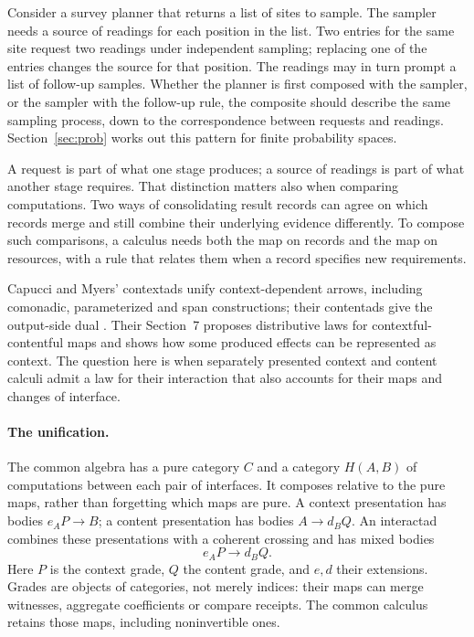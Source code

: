 \documentclass[11pt]{article}
\numberwithin{equation}{section}
\theoremstyle{definition}\newtheorem{definition}[theorem]{Definition}
\begin{document}
Consider a survey planner that returns a list of sites to sample. The
sampler needs a source of readings for each position in the list. Two
entries for the same site request two readings under independent
sampling; replacing one of the entries changes the source for that
position. The readings may in turn prompt a list of follow-up samples.
Whether the planner is first composed with the sampler, or the sampler
with the follow-up rule, the composite should describe the same sampling
process, down to the correspondence between requests and readings.
Section~\ref{sec:prob} works out this pattern for finite probability spaces.

A request is part of what one stage produces; a source of readings is
part of what another stage requires. That distinction matters also when
comparing computations. Two ways of consolidating result records can
agree on which records merge and still combine their underlying evidence
differently. To compose such comparisons, a calculus needs both the map
on records and the map on resources, with a rule that relates them when
a record specifies new requirements.

Capucci and Myers' contextads unify context-dependent arrows, including
comonadic, parameterized and span constructions; their contentads give
the output-side dual \cite{CM}. Their Section~7 proposes distributive laws
for contextful-contentful maps and shows how some produced effects can be
represented as context. The question here is when separately presented
context and content calculi admit a law for their interaction that also
accounts for their maps and changes of interface.

\paragraph{The unification.}
The common algebra has a pure category $C$ and a category $H(A,B)$ of
computations between each pair of interfaces. It composes relative to the
pure maps, rather than forgetting which maps are pure. A context presentation
has bodies $e_AP\to B$; a content presentation has bodies $A\to d_BQ$.
An interactad combines these presentations with a coherent crossing and has
mixed bodies
\[
                 e_AP\longrightarrow d_BQ.
\]
Here $P$ is the context grade, $Q$ the content grade, and $e,d$ their
extensions. Grades are objects of categories, not merely indices: their maps
can merge witnesses, aggregate coefficients or compare receipts. The common
calculus retains those maps, including noninvertible ones.
\end{document}
